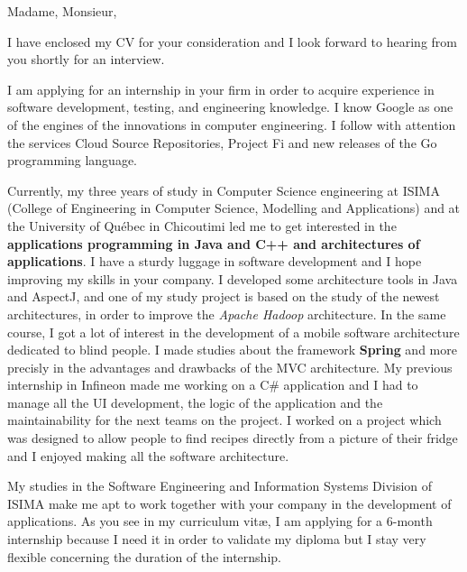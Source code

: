 
\date{\today}
\opening{Madame, Monsieur,}
\closing{I have enclosed my CV for your consideration and I look forward to hearing from you shortly for an interview.}

\makelettertitle

I am applying for an internship in your firm in order to acquire experience in software development, testing, and engineering knowledge. I know Google as one of the engines of the innovations in computer engineering. I follow with attention the services Cloud Source Repositories, Project Fi and new releases of the Go programming language.

Currently, my three years of study in Computer Science engineering at ISIMA (College of Engineering in Computer Science, Modelling and Applications) and at the University of Québec in Chicoutimi led me to get interested in the \textbf{applications programming in Java and C++ and architectures of applications}. I have a sturdy luggage in software development and I hope improving my skills in your company. I developed some architecture tools in Java and AspectJ, and one of my study project is based on the study of the newest architectures, in order to improve the \textit{Apache Hadoop} architecture. In the same course, I got a lot of interest in the development of a mobile software architecture dedicated to blind people. I made studies about the framework \textbf{Spring} and more precisly in the advantages and drawbacks of the MVC architecture. My previous internship in Infineon made me working on a C\# application and I had to manage all the UI development, the logic of the application and the maintainability for the next teams on the project. I worked on a project which was designed to allow people to find recipes directly from a picture of their fridge and I enjoyed making all the software architecture.

My studies in the Software Engineering and Information Systems Division of ISIMA make me apt to work together with your company in the development of applications. As you see in my curriculum vit\ae{}, I am applying for a 6-month internship because I need it in order to validate my diploma but I stay very flexible concerning the duration of the internship.

\makeletterclosing
